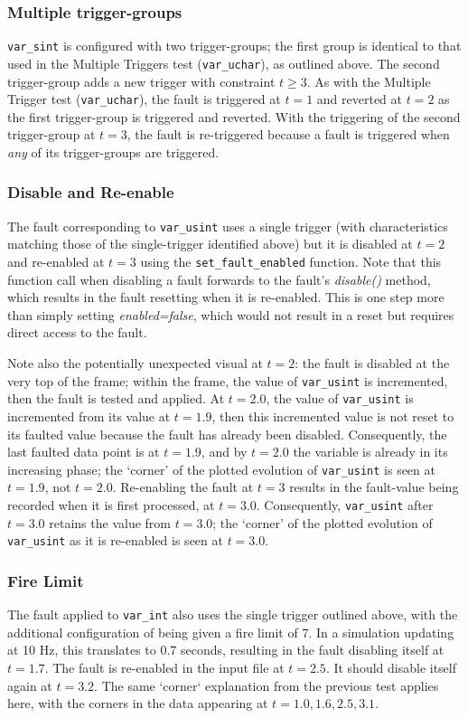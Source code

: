 \documentclass[11pt,fleqn]{report}
\begin{document}
\subsubsection{Multiple trigger-groups} \label{sec:verif:FM:stale:multigroup}
\verb'var_sint' is configured with two trigger-groups; the first group is
identical to that used in the Multiple Triggers test (\verb"var_uchar"),
as outlined above.
The second trigger-group adds a new trigger with constraint $t\geq3$.
As with the Multiple Trigger test (\verb"var_uchar"), the fault is
triggered at $t=1$ and reverted at $t=2$ as the first trigger-group is triggered
and reverted. With the triggering of the second trigger-group at $t=3$, the
fault is re-triggered because a fault is triggered when \textit{any} of its
trigger-groups are triggered.

\subsubsection{ Disable and Re-enable}
The fault corresponding to \verb"var_usint" uses a single trigger (with
characteristics matching those of the single-trigger identified above) but it
is disabled at $t=2$ and re-enabled at $t=3$ using the \verb'set_fault_enabled'
function. Note that this
function call when disabling a fault forwards to the fault's \textit{disable()}
method, which results in the fault resetting when it is re-enabled. This is one
step more than simply setting \textit{enabled=false}, which would not result in
a reset but requires direct access to the fault.

Note also the potentially unexpected visual at $t=2$: the fault is disabled
at the very top of the frame; within the frame, the value of \verb"var_usint"
is incremented, then the fault is tested and applied. At $t=2.0$, the value of
\verb"var_usint" is incremented from its value at $t=1.9$, then this
incremented value is not reset to its faulted
value because the fault has already been disabled. Consequently, the last
faulted data point is at $t=1.9$, and by $t=2.0$ the variable is already in
its increasing phase; the `corner' of the plotted evolution of
\verb"var_usint" is seen at $t=1.9$, not $t=2.0$.
Re-enabling the fault at $t=3$ results in the fault-value being
recorded when it is first processed, at $t=3.0$. Consequently,
\verb"var_usint" after $t=3.0$ retains the value from $t=3.0$; the
`corner' of the plotted evolution of \verb"var_usint" as it is re-enabled is
seen at $t=3.0$.

\subsubsection {Fire Limit}
The fault applied to \verb"var_int" also uses the single trigger outlined
above, with the additional configuration of being given a fire
limit of 7. In a simulation updating at 10 Hz, this translates to 0.7 seconds,
resulting in the fault disabling itself at $t=1.7$. The fault is re-enabled in
the input file at $t=2.5$.
It should disable itself again at $t=3.2$.
The same `corner` explanation from the previous test applies here, with the
corners in the data appearing at $t=1.0, 1.6, 2.5, 3.1$.
\end{document}
